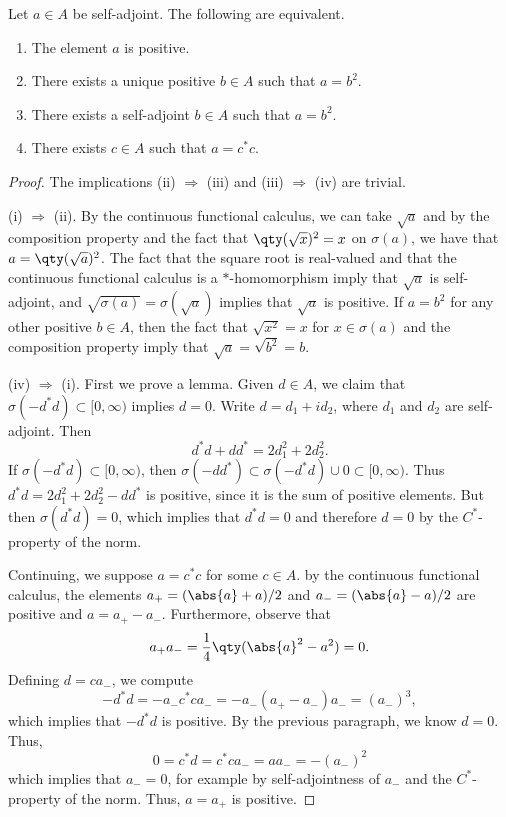 \begin{proposition}\label{prop:positive_conditions}
Let $a \in A$ be self-adjoint. The following are equivalent.
	\begin{enumerate}
		\item[\tn{(i)}] The element $a$ is positive.
		\item[\tn{(ii)}] There exists a unique positive $b \in A$ such that $a = b^2$.
		\item[\tn{(iii)}] There exists a self-adjoint $b \in A$ such that $a = b^2$.
		\item[\tn{(iv)}] There exists $c \in A$ such that $a = c^*c$.
	\end{enumerate}
\end{proposition}

\begin{proof}
The implications (ii) $\Rightarrow$ (iii) and (iii) $\Rightarrow$ (iv) are trivial. 

(i) $\Rightarrow$ (ii). By the continuous functional calculus, we can take $\sqrt{a}$ and by the composition property and the fact that $\qty(\sqrt{x})^2 = x$ on $\sigma(a)$, we have that $a = \qty(\sqrt{a})^2$. The fact that the square root is real-valued and that the continuous functional calculus is a $*$-homomorphism imply that $\sqrt{a}$ is self-adjoint, and $\sqrt{\sigma(a)} = \sigma(\sqrt{a})$ implies that $\sqrt{a}$ is positive. If $a = b^2$ for any other positive $b \in A$, then the fact that $\sqrt{x^2} = x$ for $x \in \sigma(a)$ and the composition property imply that $\sqrt{a} = \sqrt{b^2} = b$.

(iv) $\Rightarrow$ (i). First we prove a lemma. Given $d \in A$, we claim that $\sigma(-d^*d) \subset [0,\infty)$ implies $d = 0$. Write $d = d_1 + id_2$, where $d_1$ and $d_2$ are self-adjoint. Then
\begin{equation}
d^*d + dd^* =  2d_1^2 + 2d_2^2.
\end{equation}
If $\sigma(-d^*d) \subset [0,\infty)$, then $\sigma(-dd^*) \subset \sigma(-d^*d) \cup \qty{0} \subset [0,\infty)$. Thus $d^*d = 2d_1^2 + 2d_2^2 - dd^*$ is positive, since it is the sum of positive elements. But then $\sigma(d^*d) = \qty{0}$, which implies that $d^*d = 0$ and therefore $d = 0$ by the $C^*$-property of the norm.

Continuing, we suppose $a = c^*c$ for some $c \in A$. by the continuous functional calculus, the elements $a_+ = (\abs{a} + a)/2$ and $a_- = (\abs{a} - a)/2$ are positive and $a = a_+ - a_-$. Furthermore, observe that
\begin{equation}
a_+ a_- = \frac{1}{4}\qty(\abs{a}^2 - a^2) = 0.
\end{equation}
Defining $d = ca_-$, we compute 
\begin{equation}
-d^*d = -a_- c^* c a_- = -a_-(a_+ - a_-)a_- = (a_-)^3,
\end{equation}
which implies that $-d^*d$ is positive. By the previous paragraph, we know $d = 0$. Thus,
\begin{equation}
0 = c^* d = c^*c a_- = aa_- = - (a_-)^2
\end{equation}
which implies that $a_- = 0$, for example by self-adjointness of $a_-$ and the $C^*$-property of the norm. Thus, $a = a_+$ is positive.
\end{proof}

